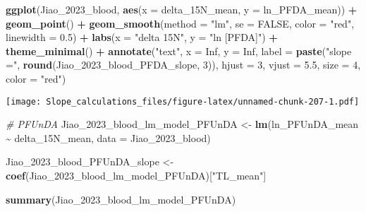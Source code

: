 \documentclass[
]{article}
\newenvironment{Shaded}{\begin{snugshade}}{\end{snugshade}}
\newcommand{\AttributeTok}[1]{\textcolor[rgb]{0.13,0.29,0.53}{#1}}
\newcommand{\CommentTok}[1]{\textcolor[rgb]{0.56,0.35,0.01}{\textit{#1}}}
\newcommand{\ConstantTok}[1]{\textcolor[rgb]{0.56,0.35,0.01}{#1}}
\newcommand{\DecValTok}[1]{\textcolor[rgb]{0.00,0.00,0.81}{#1}}
\newcommand{\FloatTok}[1]{\textcolor[rgb]{0.00,0.00,0.81}{#1}}
\newcommand{\FunctionTok}[1]{\textcolor[rgb]{0.13,0.29,0.53}{\textbf{#1}}}
\newcommand{\NormalTok}[1]{#1}
\newcommand{\OtherTok}[1]{\textcolor[rgb]{0.56,0.35,0.01}{#1}}
\newcommand{\SpecialCharTok}[1]{\textcolor[rgb]{0.81,0.36,0.00}{\textbf{#1}}}
\newcommand{\StringTok}[1]{\textcolor[rgb]{0.31,0.60,0.02}{#1}}
\begin{document}
\begin{Shaded}
\begin{Highlighting}[]
\FunctionTok{ggplot}\NormalTok{(Jiao\_2023\_blood, }\FunctionTok{aes}\NormalTok{(}\AttributeTok{x =}\NormalTok{ delta\_15N\_mean, }\AttributeTok{y =}\NormalTok{ ln\_PFDA\_mean)) }\SpecialCharTok{+}
  \FunctionTok{geom\_point}\NormalTok{() }\SpecialCharTok{+}
  \FunctionTok{geom\_smooth}\NormalTok{(}\AttributeTok{method =} \StringTok{"lm"}\NormalTok{, }\AttributeTok{se =} \ConstantTok{FALSE}\NormalTok{, }\AttributeTok{color =} \StringTok{"red"}\NormalTok{, }\AttributeTok{linewidth =} \FloatTok{0.5}\NormalTok{) }\SpecialCharTok{+}
  \FunctionTok{labs}\NormalTok{(}\AttributeTok{x =} \StringTok{"delta 15N"}\NormalTok{,}
       \AttributeTok{y =} \StringTok{"ln [PFDA]"}\NormalTok{) }\SpecialCharTok{+}
  \FunctionTok{theme\_minimal}\NormalTok{() }\SpecialCharTok{+}
  \FunctionTok{annotate}\NormalTok{(}\StringTok{"text"}\NormalTok{, }\AttributeTok{x =} \ConstantTok{Inf}\NormalTok{, }\AttributeTok{y =} \ConstantTok{Inf}\NormalTok{, }\AttributeTok{label =} \FunctionTok{paste}\NormalTok{(}\StringTok{"slope ="}\NormalTok{, }\FunctionTok{round}\NormalTok{(Jiao\_2023\_blood\_PFDA\_slope, }\DecValTok{3}\NormalTok{)), }
           \AttributeTok{hjust =} \DecValTok{3}\NormalTok{, }\AttributeTok{vjust =} \FloatTok{5.5}\NormalTok{, }\AttributeTok{size =} \DecValTok{4}\NormalTok{, }\AttributeTok{color =} \StringTok{"red"}\NormalTok{)}
\end{Highlighting}
\end{Shaded}

\texttt{[image: Slope\_calculations\_files/figure-latex/unnamed-chunk-207-1.pdf]}

\begin{Shaded}
\begin{Highlighting}[]
\CommentTok{\# PFUnDA}
\NormalTok{Jiao\_2023\_blood\_lm\_model\_PFUnDA }\OtherTok{\textless{}{-}} \FunctionTok{lm}\NormalTok{(ln\_PFUnDA\_mean }\SpecialCharTok{\textasciitilde{}}\NormalTok{ delta\_15N\_mean,}
                                    \AttributeTok{data =}\NormalTok{ Jiao\_2023\_blood)}

\NormalTok{Jiao\_2023\_blood\_PFUnDA\_slope }\OtherTok{\textless{}{-}} \FunctionTok{coef}\NormalTok{(Jiao\_2023\_blood\_lm\_model\_PFUnDA)[}\StringTok{"TL\_mean"}\NormalTok{]}

\FunctionTok{summary}\NormalTok{(Jiao\_2023\_blood\_lm\_model\_PFUnDA)}
\end{Highlighting}
\end{Shaded}
\end{document}
